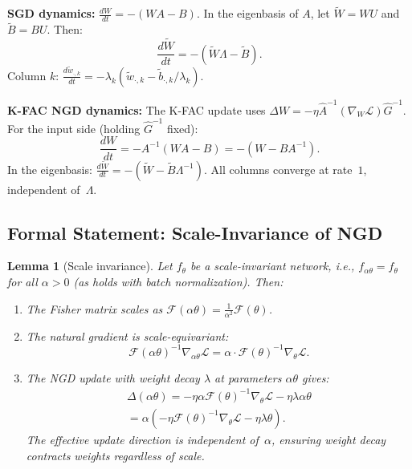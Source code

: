 \documentclass{article}
\providecommand{\FIM}{\mathcal{F}}
\theoremstyle{plain}
\newtheorem{lemma}{Lemma}
\theoremstyle{definition}
\theoremstyle{remark}
\begin{document}
\textbf{SGD dynamics:} $\frac{dW}{dt} = -(WA - B)$. In the eigenbasis of $A$, let $\tilde{W} = WU$ and $\tilde{B} = BU$. Then:
\begin{equation}
    \frac{d\tilde{W}}{dt} = -(\tilde{W}\Lambda - \tilde{B}).
\end{equation}
Column $k$: $\frac{d\tilde{w}_{\cdot,k}}{dt} = -\lambda_k(\tilde{w}_{\cdot,k} - \tilde{b}_{\cdot,k}/\lambda_k)$.

\textbf{K-FAC NGD dynamics:} The K-FAC update uses $\Delta W = -\eta \hat{A}^{-1}(\nabla_W \mathcal{L})\hat{G}^{-1}$. For the input side (holding $\hat{G}^{-1}$ fixed):
\begin{equation}
    \frac{dW}{dt} = -A^{-1}(WA - B) = -(W - BA^{-1}).
\end{equation}
In the eigenbasis: $\frac{d\tilde{W}}{dt} = -(\tilde{W} - \tilde{B}\Lambda^{-1})$. All columns converge at rate~$1$, independent of~$\Lambda$.

\subsection{Formal Statement: Scale-Invariance of NGD}

\begin{lemma}[Scale invariance]
\label{lem:scale}
Let $f_\theta$ be a scale-invariant network, i.e., $f_{\alpha\theta} = f_\theta$ for all $\alpha > 0$ (as holds with batch normalization). Then:
\begin{enumerate}
    \item The Fisher matrix scales as $\FIM(\alpha\theta) = \frac{1}{\alpha^2}\FIM(\theta)$.
    \item The natural gradient is scale-equivariant:
    \begin{equation}
        \FIM(\alpha\theta)^{-1}\nabla_{\alpha\theta}\mathcal{L} = \alpha \cdot \FIM(\theta)^{-1}\nabla_\theta \mathcal{L}.
    \end{equation}
    \item The NGD update with weight decay $\lambda$ at parameters $\alpha\theta$ gives:
    \begin{multline}
        \Delta(\alpha\theta) = -\eta\alpha \FIM(\theta)^{-1}\nabla_\theta\mathcal{L} - \eta\lambda\alpha\theta \\
        = \alpha\!\left(-\eta\FIM(\theta)^{-1}\nabla_\theta\mathcal{L} - \eta\lambda\theta\right).
    \end{multline}
    The effective update direction is \emph{independent} of~$\alpha$, ensuring weight decay contracts weights regardless of scale.
\end{enumerate}
\end{lemma}
\end{document}
